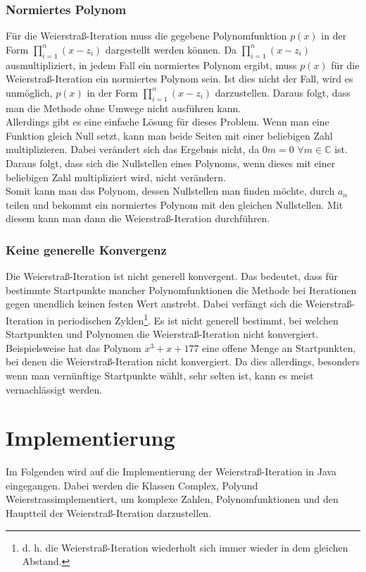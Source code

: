 \documentclass[12pt]{article}
\begin{document}
\subsubsection{Normiertes Polynom}
Für die Weierstraß-Iteration muss die gegebene Polynomfunktion $p(x)$ in der Form $\prod_{i=1}^n (x-z_i)$ dargestellt werden können. Da $\prod_{i=1}^n (x-z_i)$ ausmultipliziert, in jedem Fall ein normiertes Polynom ergibt, muss $p(x)$ für die Weierstraß-Iteration ein normiertes Polynom sein.
Ist dies nicht der Fall, wird es unmöglich, $p(x)$ in der Form $\prod_{i=1}^n (x-z_i)$ darzustellen. Daraus folgt, dass man die Methode ohne Umwege nicht ausführen kann. \\
Allerdings gibt es eine einfache Lösung für dieses Problem. Wenn man eine Funktion gleich Null setzt, kann man beide Seiten mit einer beliebigen Zahl multiplizieren. Dabei verändert sich das Ergebnis nicht, da $0m = 0$ \space $\forall m \in \mathbb{C}$ ist. Daraus folgt, dass sich die Nullstellen eines Polynoms, wenn dieses mit einer beliebigen Zahl multipliziert wird, nicht verändern. \\
Somit kann man das Polynom, dessen Nullstellen man finden möchte, durch $a_n$ teilen und bekommt ein normiertes Polynom mit den gleichen Nullstellen. Mit diesem kann man dann die Weierstraß-Iteration durchführen.

\subsubsection{Keine generelle Konvergenz}
Die Weierstraß-Iteration ist nicht generell konvergent. Das bedeutet, dass für bestimmte Startpunkte mancher Polynomfunktionen die Methode bei Iterationen gegen unendlich keinen festen Wert anstrebt. Dabei verfängt sich die Weierstraß-Iteration in periodischen Zyklen\footnote{d. h. die Weierstraß-Iteration wiederholt sich immer wieder in dem gleichen Abstand.}. Es ist nicht generell bestimmt, bei welchen Startpunkten und Polynomen die Weierstraß-Iteration nicht konvergiert. Beispielsweise hat das Polynom $x^3+x+177$ eine offene Menge an Startpunkten, bei denen die Weierstraß-Iteration nicht konvergiert. Da dies allerdings, besonders wenn man vernünftige Startpunkte wählt, sehr selten ist, kann es meist vernachlässigt werden. 



\section{Implementierung}
Im Folgenden wird auf die Implementierung der Weierstraß-Iteration in Java eingegangen. Dabei werden die Klassen \glqq Complex\grqq, \glqq Poly\grqq\space und \glqq Weierstrass\grqq\space implementiert, um komplexe Zahlen, Polynomfunktionen und den Hauptteil der Weierstraß-Iteration darzustellen.
\end{document}
